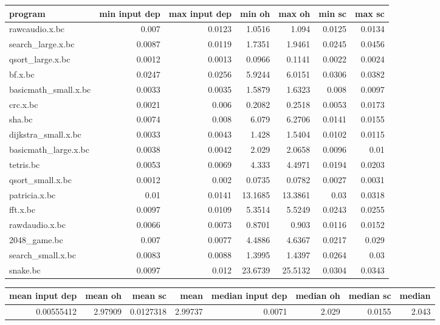 \begin{tabular}{lrrrrrr}
\hline
 program              &   min input dep &   max input dep &   min oh &   max oh &   min sc &   max sc \\
\hline
 rawcaudio.x.bc       &          0.007  &          0.0123 &   1.0516 &   1.094  &   0.0125 &   0.0134 \\
 search\_large.x.bc    &          0.0087 &          0.0119 &   1.7351 &   1.9461 &   0.0245 &   0.0456 \\
 qsort\_large.x.bc     &          0.0012 &          0.0013 &   0.0966 &   0.1141 &   0.0022 &   0.0024 \\
 bf.x.bc              &          0.0247 &          0.0256 &   5.9244 &   6.0151 &   0.0306 &   0.0382 \\
 basicmath\_small.x.bc &          0.0033 &          0.0035 &   1.5879 &   1.6323 &   0.008  &   0.0097 \\
 crc.x.bc             &          0.0021 &          0.006  &   0.2082 &   0.2518 &   0.0053 &   0.0173 \\
 sha.bc               &          0.0074 &          0.008  &   6.079  &   6.2706 &   0.0141 &   0.0155 \\
 dijkstra\_small.x.bc  &          0.0033 &          0.0043 &   1.428  &   1.5404 &   0.0102 &   0.0115 \\
 basicmath\_large.x.bc &          0.0038 &          0.0042 &   2.029  &   2.0658 &   0.0096 &   0.01   \\
 tetris.bc            &          0.0053 &          0.0069 &   4.333  &   4.4971 &   0.0194 &   0.0203 \\
 qsort\_small.x.bc     &          0.0012 &          0.002  &   0.0735 &   0.0782 &   0.0027 &   0.0031 \\
 patricia.x.bc        &          0.01   &          0.0141 &  13.1685 &  13.3861 &   0.03   &   0.0318 \\
 fft.x.bc             &          0.0097 &          0.0109 &   5.3514 &   5.5249 &   0.0243 &   0.0255 \\
 rawdaudio.x.bc       &          0.0066 &          0.0073 &   0.8701 &   0.903  &   0.0116 &   0.0152 \\
 2048\_game.bc         &          0.007  &          0.0077 &   4.4886 &   4.6367 &   0.0217 &   0.029  \\
 search\_small.x.bc    &          0.0083 &          0.0088 &   1.3995 &   1.4397 &   0.0264 &   0.03   \\
 snake.bc             &          0.0097 &          0.012  &  23.6739 &  25.5132 &   0.0304 &   0.0343 \\
\hline
\end{tabular}\begin{tabular}{rrrrrrrr}
\hline
   mean input dep &   mean oh &   mean sc &    mean &   median input dep &   median oh &   median sc &   median \\
\hline
       0.00555412 &   2.97909 & 0.0127318 & 2.99737 &             0.0071 &       2.029 &      0.0155 &    2.043 \\
\hline
\end{tabular}